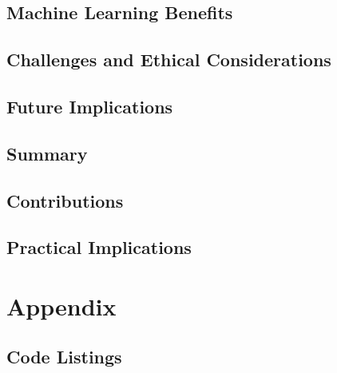 \documentclass[draft,final]{thesisclass} %
\begin{document}
\section{Machine Learning Benefits}
\lipsum[1]

\section{Challenges and Ethical Considerations}
\lipsum[1]

\section{Future Implications}
\lipsum[1]

\section{Summary}
\lipsum[1]

\section{Contributions}
\lipsum[1]

\section{Practical Implications}
\lipsum[1]

\backmatter


\nocite{*}
\printbibliography

\printindex

\printglossaries


\chapter{Appendix}
\setcounter{page}{1}
\setcounter{chapter}{0}

\section{Code Listings}


\end{document}
